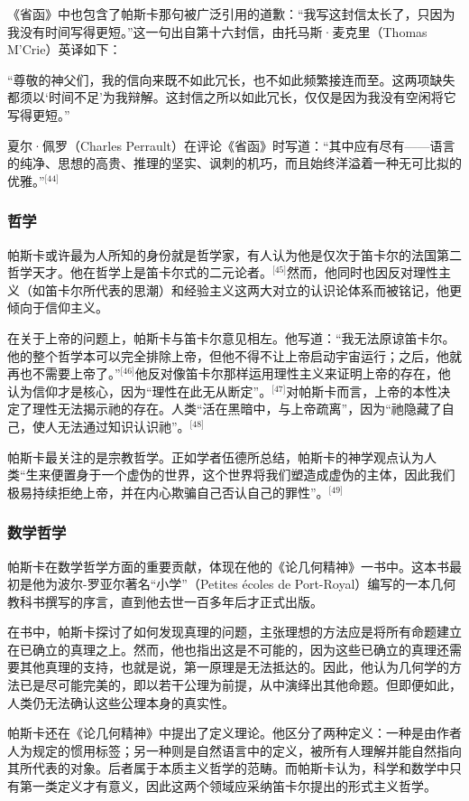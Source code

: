 《省函》中也包含了帕斯卡那句被广泛引用的道歉：“我写这封信太长了，只因为我没有时间写得更短。”这一句出自第十六封信，由托马斯·麦克里（Thomas M'Crie）英译如下：

“尊敬的神父们，我的信向来既不如此冗长，也不如此频繁接连而至。这两项缺失都须以‘时间不足’为我辩解。这封信之所以如此冗长，仅仅是因为我没有空闲将它写得更短。”

夏尔·佩罗（Charles Perrault）在评论《省函》时写道：“其中应有尽有——语言的纯净、思想的高贵、推理的坚实、讽刺的机巧，而且始终洋溢着一种无可比拟的优雅。”\(^\text{[44]}\)
\subsubsection{哲学}
帕斯卡或许最为人所知的身份就是哲学家，有人认为他是仅次于笛卡尔的法国第二哲学天才。他在哲学上是笛卡尔式的二元论者。\(^\text{[45]}\)然而，他同时也因反对理性主义（如笛卡尔所代表的思潮）和经验主义这两大对立的认识论体系而被铭记，他更倾向于信仰主义。

在关于上帝的问题上，帕斯卡与笛卡尔意见相左。他写道：“我无法原谅笛卡尔。他的整个哲学本可以完全排除上帝，但他不得不让上帝启动宇宙运行；之后，他就再也不需要上帝了。”\(^\text{[46]}\)他反对像笛卡尔那样运用理性主义来证明上帝的存在，他认为信仰才是核心，因为“理性在此无从断定”。\(^\text{[47]}\)对帕斯卡而言，上帝的本性决定了理性无法揭示祂的存在。人类“活在黑暗中，与上帝疏离”，因为“祂隐藏了自己，使人无法通过知识认识祂”。\(^\text{[48]}\)

帕斯卡最关注的是宗教哲学。正如学者伍德所总结，帕斯卡的神学观点认为人类“生来便置身于一个虚伪的世界，这个世界将我们塑造成虚伪的主体，因此我们极易持续拒绝上帝，并在内心欺骗自己否认自己的罪性”。\(^\text{[49]}\)
\subsubsection{数学哲学}
帕斯卡在数学哲学方面的重要贡献，体现在他的《论几何精神》一书中。这本书最初是他为波尔-罗亚尔著名“小学”（Petites écoles de Port-Royal）编写的一本几何教科书撰写的序言，直到他去世一百多年后才正式出版。

在书中，帕斯卡探讨了如何发现真理的问题，主张理想的方法应是将所有命题建立在已确立的真理之上。然而，他也指出这是不可能的，因为这些已确立的真理还需要其他真理的支持，也就是说，第一原理是无法抵达的。因此，他认为几何学的方法已是尽可能完美的，即以若干公理为前提，从中演绎出其他命题。但即便如此，人类仍无法确认这些公理本身的真实性。

帕斯卡还在《论几何精神》中提出了定义理论。他区分了两种定义：一种是由作者人为规定的惯用标签；另一种则是自然语言中的定义，被所有人理解并能自然指向其所代表的对象。后者属于本质主义哲学的范畴。而帕斯卡认为，科学和数学中只有第一类定义才有意义，因此这两个领域应采纳笛卡尔提出的形式主义哲学。

